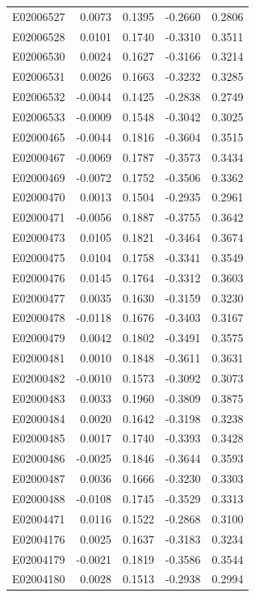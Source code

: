 \documentclass[11pt, a4paper]{article}
\begin{document}
\begin{longtable}{lrrrr}
E02006527 & 0.0073 & 0.1395 & -0.2660 & 0.2806 \\
E02006528 & 0.0101 & 0.1740 & -0.3310 & 0.3511 \\
E02006530 & 0.0024 & 0.1627 & -0.3166 & 0.3214 \\
E02006531 & 0.0026 & 0.1663 & -0.3232 & 0.3285 \\
E02006532 & -0.0044 & 0.1425 & -0.2838 & 0.2749 \\
E02006533 & -0.0009 & 0.1548 & -0.3042 & 0.3025 \\
E02000465 & -0.0044 & 0.1816 & -0.3604 & 0.3515 \\
E02000467 & -0.0069 & 0.1787 & -0.3573 & 0.3434 \\
E02000469 & -0.0072 & 0.1752 & -0.3506 & 0.3362 \\
E02000470 & 0.0013 & 0.1504 & -0.2935 & 0.2961 \\
E02000471 & -0.0056 & 0.1887 & -0.3755 & 0.3642 \\
E02000473 & 0.0105 & 0.1821 & -0.3464 & 0.3674 \\
E02000475 & 0.0104 & 0.1758 & -0.3341 & 0.3549 \\
E02000476 & 0.0145 & 0.1764 & -0.3312 & 0.3603 \\
E02000477 & 0.0035 & 0.1630 & -0.3159 & 0.3230 \\
E02000478 & -0.0118 & 0.1676 & -0.3403 & 0.3167 \\
E02000479 & 0.0042 & 0.1802 & -0.3491 & 0.3575 \\
E02000481 & 0.0010 & 0.1848 & -0.3611 & 0.3631 \\
E02000482 & -0.0010 & 0.1573 & -0.3092 & 0.3073 \\
E02000483 & 0.0033 & 0.1960 & -0.3809 & 0.3875 \\
E02000484 & 0.0020 & 0.1642 & -0.3198 & 0.3238 \\
E02000485 & 0.0017 & 0.1740 & -0.3393 & 0.3428 \\
E02000486 & -0.0025 & 0.1846 & -0.3644 & 0.3593 \\
E02000487 & 0.0036 & 0.1666 & -0.3230 & 0.3303 \\
E02000488 & -0.0108 & 0.1745 & -0.3529 & 0.3313 \\
E02004471 & 0.0116 & 0.1522 & -0.2868 & 0.3100 \\
E02004176 & 0.0025 & 0.1637 & -0.3183 & 0.3234 \\
E02004179 & -0.0021 & 0.1819 & -0.3586 & 0.3544 \\
E02004180 & 0.0028 & 0.1513 & -0.2938 & 0.2994 \\

\end{longtable}
\end{document}
